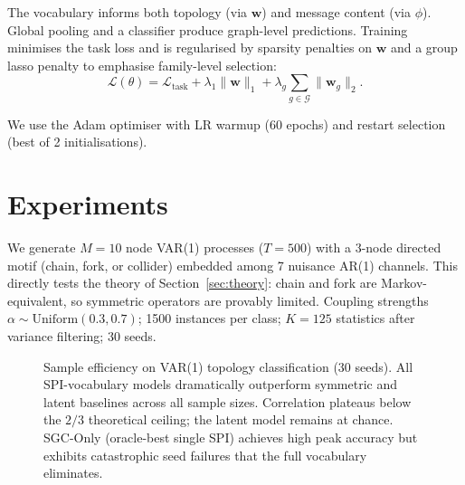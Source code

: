 \documentclass{article}
\theoremstyle{plain}
\begin{document}
The vocabulary informs both topology (via $\mathbf{w}$) and message content (via $\phi$). Global pooling and a classifier produce graph-level predictions. Training minimises the task loss and is regularised by sparsity penalties on $\mathbf{w}$ and a group lasso penalty to emphasise family-level selection:
\begin{equation}
\label{eq:training_eq}
\mathcal{L}(\theta)=\mathcal{L}_{\mathrm{task}} + \lambda_1 \|\mathbf{w} \|_1 + \lambda_g \sum_{g\in \mathcal{G}}{\|\mathbf{w}_g\|_2}.
\end{equation}

We use the Adam optimiser with LR warmup (60 epochs) and restart selection (best of 2 initialisations).

\section{Experiments}
\label{sec:experiments}

We generate $M{=}10$ node VAR(1) processes ($T{=}500$) with a 3-node directed motif (chain, fork, or collider) embedded among 7 nuisance AR(1) channels. This directly tests the theory of Section~\ref{sec:theory}: chain and fork are Markov-equivalent, so symmetric operators are provably limited. Coupling strengths $\alpha \sim \mathrm{Uniform}(0.3, 0.7)$; 1500 instances per class; $K{=}125$ statistics after variance filtering; 30 seeds.

\begin{figure}[t]
\vskip 0.2in
\begin{center}
\caption{Sample efficiency on VAR(1) topology classification (30 seeds). All SPI-vocabulary models dramatically outperform symmetric and latent baselines across all sample sizes. Correlation plateaus below the $2/3$ theoretical ceiling; the latent model remains at chance. SGC-Only (oracle-best single SPI) achieves high peak accuracy but exhibits catastrophic seed failures that the full vocabulary eliminates.}
\label{fig:sample_efficiency}
\end{center}
\vskip -0.2in
\end{figure}
\end{document}
